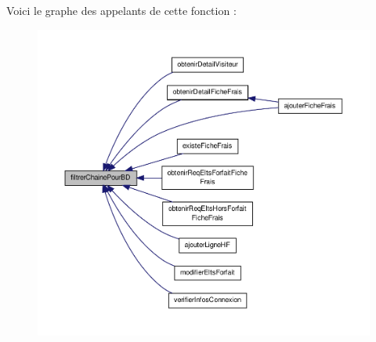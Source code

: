 Voici le graphe des appelants de cette fonction \-:\nopagebreak
\begin{figure}[H]
\begin{center}
\leavevmode
\includegraphics[width=350pt]{__bd_gestion_donnees_8lib_8php_af2cca7a3ba7b15f9cedf99333367e598_icgraph}
\end{center}
\end{figure}


